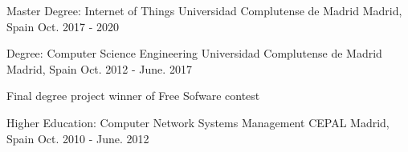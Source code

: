 

\begin{cventries}

  \cventry
    {Master Degree: Internet of Things}
    {Universidad Complutense de Madrid} %
    {Madrid, Spain} %
    {Oct. 2017 - 2020} %
    {
    }

  \cventry
    {Degree: Computer Science Engineering}
    {Universidad Complutense de Madrid} %
    {Madrid, Spain} %
    {Oct. 2012 - June. 2017} %
    {
      \begin{cvitems} %
        \item {Final degree project winner of Free Sofware contest}
      \end{cvitems}
    }

  \cventry
    {Higher Education: Computer Network Systems Management }
    {CEPAL} %
    {Madrid, Spain} %
    {Oct. 2010 - June. 2012} %
    {
    }

\end{cventries}
